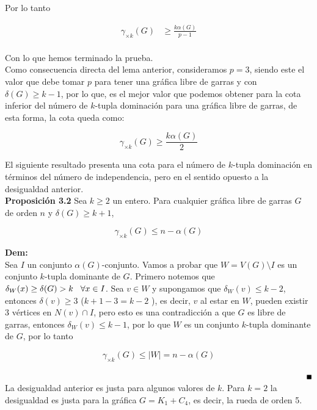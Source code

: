 \documentclass{article}
\begin{document}
Por lo tanto

\begin{align*}
\gamma_{\times k}(G)&\geq \frac{k\alpha(G)}{p-1}\\
\end{align*}

 Con lo que hemos terminado la prueba.\\


 Como consecuencia directa del lema anterior, consideramos $p=3$, siendo este el valor que debe tomar $p$ para tener una gráfica libre de garras y con $\delta(G)\geq k-1$, por lo que, es el mejor valor que podemos obtener para la cota inferior del número de $k$-tupla dominación para una gráfica libre de garras, de esta forma, la cota queda como:

$$\gamma_{\times k}(G)\geq \frac{k\alpha(G)}{2}$$

El siguiente resultado presenta una cota para el número de $k$-tupla dominación en términos del número de independencia, pero en el sentido opuesto a la desigualdad anterior.\\


\textbf{Proposición 3.2} Sea $k\geq 2$ un entero. Para cualquier gráfica libre de garras $G$ de orden $n$ y $\delta(G)\ge k+1$,

$$\gamma_{\times k}(G)\leq n-\alpha(G)$$

\textbf{Dem:}\\

Sea $I$ un conjunto $\alpha(G)$-conjunto. Vamos a probar que $W=V(G)\setminus I$ es un conjunto $k$-tupla dominante de $G$.
Primero notemos que $\delta_W(x)\geq \delta(G)>k \hspace{.3cm} \forall x \in I$. Sea $v\in W$ y supongamos que $\delta_W(v) \leq k-2$, entonces $\delta(v)\geq 3$ ($k+1 - 3 = k-2$ ), es decir, $v$ al estar en $W$, pueden existir 3 vértices en $N(v)\cap I$, pero esto es una contradicción a que $G$ es libre de garras, entonces $\delta_W(v)\leq k-1$, por lo que $W$ es un conjunto $k$-tupla dominante de $G$, por lo tanto

$$\gamma_{\times k}(G)\leq |W|=n-\alpha(G)$$

$\hspace{15.5cm}\blacksquare$\\

La desigualdad anterior es justa para algunos valores de $k$. Para $k=2$ la desigualdad es justa para la gráfica $G=K_1 + C_4$, es decir, la rueda de orden 5. 
\end{document}
